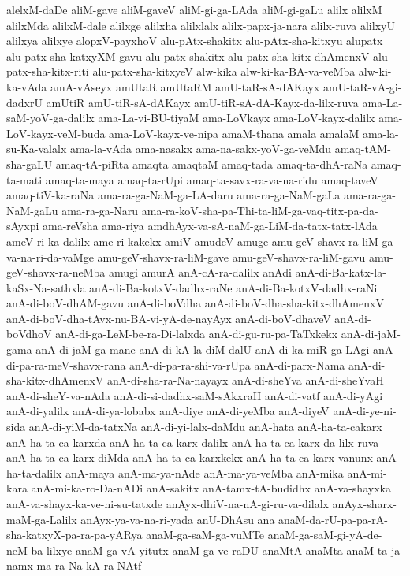 {alelxM-daDe
aliM-gave
aliM-gaveV
aliM-gi-ga-LAda
aliM-gi-gaLu
alilx
alilxM
alilxMda
alilxM-dale
alilxge
alilxha
alilxlalx
alilx-papx-ja-nara
alilx-ruva
alilxyU
alilxya
alilxye
alopxV-payxhoV
alu-pAtx-shakitx
alu-pAtx-sha-kitxyu
alupatx
alu-patx-sha-katxyXM-gavu
alu-patx-shakitx
alu-patx-sha-kitx-dhAmenxV
alu-patx-sha-kitx-riti
alu-patx-sha-kitxyeV
alw-kika
alw-ki-ka-BA-va-veMba
alw-ki-ka-vAda
amA-vAseyx
amUtaR
amUtaRM
amU-taR-sA-dAKayx
amU-taR-vA-gi-dadxrU
amUtiR
amU-tiR-sA-dAKayx
amU-tiR-sA-dA-Kayx-da-lilx-ruva
ama-La-saM-yoV-ga-dalilx
ama-La-vi-BU-tiyaM
ama-LoVkayx
ama-LoV-kayx-dalilx
ama-LoV-kayx-veM-buda
ama-LoV-kayx-ve-nipa
amaM-thana
amala
amalaM
ama-la-su-Ka-valalx
ama-la-vAda
ama-nasakx
ama-na-sakx-yoV-ga-veMdu
amaq-tAM-sha-gaLU
amaq-tA-piRta
amaqta
amaqtaM
amaq-tada
amaq-ta-dhA-raNa
amaq-ta-mati
amaq-ta-maya
amaq-ta-rUpi
amaq-ta-savx-ra-va-na-ridu
amaq-taveV
amaq-tiV-ka-raNa
ama-ra-ga-NaM-ga-LA-daru
ama-ra-ga-NaM-gaLa
ama-ra-ga-NaM-gaLu
ama-ra-ga-Naru
ama-ra-koV-sha-pa-Thi-ta-liM-ga-vaq-titx-pa-da-sAyxpi
ama-reVsha
ama-riya
amdhAyx-va-sA-naM-ga-LiM-da-tatx-tatx-lAda
ameV-ri-ka-dalilx
ame-ri-kakekx
amiV
amudeV
amuge
amu-geV-shavx-ra-liM-ga-va-na-ri-da-vaMge
amu-geV-shavx-ra-liM-gave
amu-geV-shavx-ra-liM-gavu
amu-geV-shavx-ra-neMba
amugi
amurA
anA-cA-ra-dalilx
anAdi
anA-di-Ba-katx-la-kaSx-Na-sathxla
anA-di-Ba-kotxV-dadhx-raNe
anA-di-Ba-kotxV-dadhx-raNi
anA-di-boV-dhAM-gavu
anA-di-boVdha
anA-di-boV-dha-sha-kitx-dhAmenxV
anA-di-boV-dha-tAvx-nu-BA-vi-yA-de-nayAyx
anA-di-boV-dhaveV
anA-di-boVdhoV
anA-di-ga-LeM-be-ra-Di-lalxda
anA-di-gu-ru-pa-TaTxkekx
anA-di-jaM-gama
anA-di-jaM-ga-mane
anA-di-kA-la-diM-dalU
anA-di-ka-miR-ga-LAgi
anA-di-pa-ra-meV-shavx-rana
anA-di-pa-ra-shi-va-rUpa
anA-di-parx-Nama
anA-di-sha-kitx-dhAmenxV
anA-di-sha-ra-Na-nayayx
anA-di-sheYva
anA-di-sheYvaH
anA-di-sheY-va-nAda
anA-di-si-dadhx-saM-sAkxraH
anA-di-vatf
anA-di-yAgi
anA-di-yalilx
anA-di-ya-lobabx
anA-diye
anA-di-yeMba
anA-diyeV
anA-di-ye-ni-sida
anA-di-yiM-da-tatxNa
anA-di-yi-lalx-daMdu
anA-hata
anA-ha-ta-cakarx
anA-ha-ta-ca-karxda
anA-ha-ta-ca-karx-dalilx
anA-ha-ta-ca-karx-da-lilx-ruva
anA-ha-ta-ca-karx-diMda
anA-ha-ta-ca-karxkekx
anA-ha-ta-ca-karx-vanunx
anA-ha-ta-dalilx
anA-maya
anA-ma-ya-nAde
anA-ma-ya-veMba
anA-mika
anA-mi-kara
anA-mi-ka-ro-Da-nADi
anA-sakitx
anA-tamx-tA-budidhx
anA-va-shayxka
anA-va-shayx-ka-ve-ni-su-tatxde
anAyx-dhiV-na-nA-gi-ru-va-dilalx
anAyx-sharx-maM-ga-Lalilx
anAyx-ya-va-na-ri-yada
anU-DhAsu
ana
anaM-da-rU-pa-pa-rA-sha-katxyX-pa-ra-pa-yARya
anaM-ga-saM-ga-vuMTe
anaM-ga-saM-gi-yA-de-neM-ba-lilxye
anaM-ga-vA-yitutx
anaM-ga-ve-raDU
anaMtA
anaMta
anaM-ta-ja-namx-ma-ra-Na-kA-ra-NAtf
}
